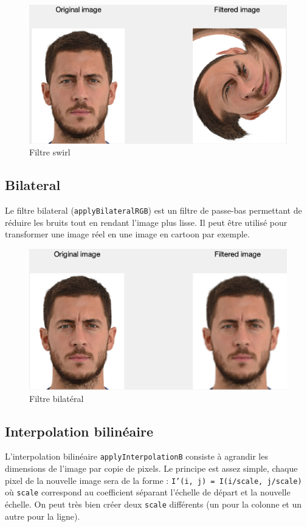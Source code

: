 \documentclass[12pt,a4paper]{article}
\begin{document}
\begin{figure}[H]
\centering
\includegraphics[scale=0.5]{img/swirl}
\caption{Filtre swirl}
\end{figure}

\subsection{Bilateral}
Le filtre bilateral (\texttt{applyBilateralRGB}) est un filtre de passe-bas permettant de réduire les bruits tout en rendant l'image plus lisse. Il peut être utilisé pour transformer une image réel en une image en cartoon par exemple.

\begin{figure}[H]
\centering
\includegraphics[scale=0.5]{img/bilateral}
\caption{Filtre bilatéral}
\end{figure}

\subsection{Interpolation bilinéaire}
L'interpolation bilinéaire \texttt{applyInterpolationB} consiste à agrandir les dimensions de l'image par copie de pixels. Le principe est assez simple, chaque pixel de la nouvelle image sera de la forme : \texttt{I'(i, j) = I(i/scale, j/scale)} où \texttt{scale} correspond au coefficient séparant l'échelle de départ et la nouvelle échelle. On peut très bien créer deux \texttt{scale} différents (un pour la colonne et un autre pour la ligne).
\end{document}
